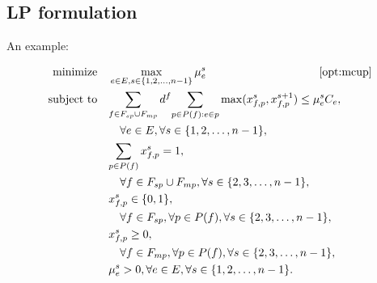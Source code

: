 \subsection{LP formulation}
An example:

\begin{subequations}\label{opt:mcup}
\begin{align}
\text{minimize} & \quad\max_{e \in E,s \in \{1, 2, \dots, n-1 \}} \mu_e^s \quad\quad\quad\quad\quad\quad\quad\quad\quad\quad\eqref{opt:mcup}\notag\\
\text{subject to} & \quad {\sum_{f \in F_{sp} \cup F_{mp}} d^f {\sum_{p \in P(f): e\in p} \max(x_{f,p}^s},x_{f,p}^{s+1})}
\leq \mu_e^s C_{e}, \notag \\
& \quad\quad\forall e \in E, \forall s \in \{1, 2, \dots, n-1 \}, \label{equ:CapacityConstraint}\\
& \quad{\sum_{p \in P(f)} x_{f,p}^s} = 1, \notag \\
& \quad\quad\forall f \in F_{sp} \cup F_{mp}, \forall s \in \{2, 3, \dots, n-1 \}, \label{equ:SumConstraint}\\
& \quad x_{f,p}^s \in \{0,1\}, \notag \\
& \quad\quad\forall f \in F_{sp}, \forall p \in P(f), \forall s \in \{2, 3, \dots, n-1 \}, \label{equ:SinglePath}\\
& \quad x_{f,p}^s \geq 0, \notag \\
& \quad\quad\forall f \in F_{mp}, \forall p \in P(f), \forall s \in \{2, 3, \dots, n-1 \},
\label{equ:Multipath}\\
& \quad\mu_e^s > 0, \forall e \in E, \forall s \in \{1, 2, \dots, n-1 \}. \label{equ:ObjPositiveCostraint}
\end{align}
\end{subequations}
